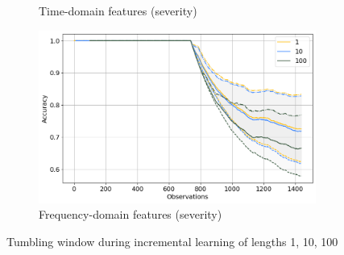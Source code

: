 \begin{figure}[]
\begin{subfigure}[b]{0.48\textwidth}
        \caption{Time-domain features (severity)}
    \end{subfigure}
    \hfill
    \begin{subfigure}[b]{0.48\textwidth}
        \includegraphics[width=\textwidth]{assets/results/incremental-learning/tumbling-FD-severity.png}
        \caption{Frequency-domain features (severity)}
    \end{subfigure} 
    \caption{Tumbling window during incremental learning of lengths 1, 10, 100}
    \label{fig:evaluation:tumbling-window-online}
\end{figure}

